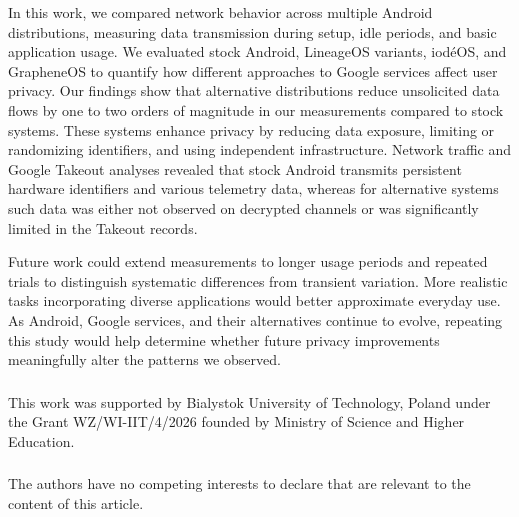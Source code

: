 In this work, we compared network behavior across multiple Android distributions, measuring data transmission during setup, idle periods, and basic application usage. We evaluated stock Android, LineageOS variants, iod\'eOS, and GrapheneOS to quantify how different approaches to Google services affect user privacy. Our findings show that alternative distributions reduce unsolicited data flows by one to two orders of magnitude in our measurements compared to stock systems. These systems enhance privacy by reducing data exposure, limiting or randomizing identifiers, and using independent infrastructure. Network traffic and Google Takeout analyses revealed that stock Android transmits persistent hardware identifiers and various telemetry data, whereas for alternative systems such data was either not observed on decrypted channels or was significantly limited in the Takeout records.

Future work could extend measurements to longer usage periods and repeated trials to distinguish systematic differences from transient variation. More realistic tasks incorporating diverse applications would better approximate everyday use. As Android, Google services, and their alternatives continue to evolve, repeating this study would help determine whether future privacy improvements meaningfully alter the patterns we observed.

\begin{credits}
	\subsubsection{\ackname}
	This work was supported by Bialystok University of Technology, Poland under the Grant WZ/WI-IIT/4/2026 founded by Ministry of Science and Higher Education.
	
	\subsubsection{\discintname}
	The authors have no competing interests to declare that are
	relevant to the content of this article. 
\end{credits}